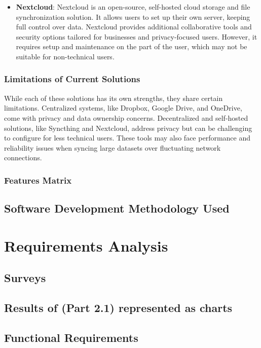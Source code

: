 \documentclass{book}
\begin{document}
\begin{itemize}
      \item \textbf{Nextcloud}: Nextcloud is an open-source, self-hosted cloud storage and file synchronization solution. It allows users to set up their own server, keeping full control over data. Nextcloud provides additional collaborative tools and security options tailored for businesses and privacy-focused users. However, it requires setup and maintenance on the part of the user, which may not be suitable for non-technical users.
  \end{itemize}

\subsection{Limitations of Current Solutions}

While each of these solutions has its own strengths, they share certain limitations. Centralized systems, like Dropbox, Google Drive, and OneDrive, come with privacy and data ownership concerns. Decentralized and self-hosted solutions, like Syncthing and Nextcloud, address privacy but can be challenging to configure for less technical users. These tools may also face performance and reliability issues when syncing large datasets over fluctuating network connections.
			\subsection{Features Matrix}
			
		\section{Software Development Methodology Used}
	
	\chapter{Requirements Analysis}
		\section{Surveys}
		
		\section{Results of (Part 2.1) represented as charts}
		
		\section{Functional Requirements}
		
\end{document}
